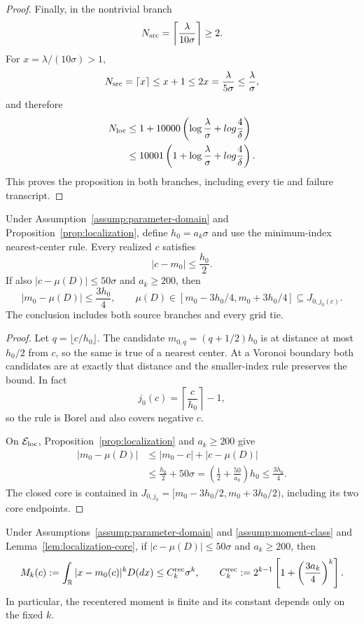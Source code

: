 \begin{proof}
Finally, in the nontrivial branch
\[
 N_{\rm src}=\left\lceil\frac\lambda{10\sigma}\right\rceil\geq2.
\]
For $x=\lambda/(10\sigma)>1$,
\[
 N_{\rm src}=\lceil x\rceil\leq x+1\leq2x
 =\frac\lambda{5\sigma}\leq\frac\lambda\sigma,
\]
and therefore
\[
\begin{aligned}
 N_{\rm loc}
 &\leq1+10000\left(\log\frac\lambda\sigma+log\frac4\delta\right)\\
 &\leq10001\left(1+\log\frac\lambda\sigma+log\frac4\delta\right).
\end{aligned}
\]
This proves the proposition in both branches, including every tie and failure
transcript.
\end{proof}

\begin{lemma}\label{lem:localization-core}
Under Assumption~\ref{assump:parameter-domain} and
Proposition~\ref{prop:localization}, define $h_0=a_k\sigma$ and use the
minimum-index nearest-center rule.  Every realized $c$ satisfies
\[
 |c-m_0|\leq\frac{h_0}{2}.
\]
If also $|c-\mu(D)|\leq50\sigma$ and $a_k\geq200$, then
\[
 |m_0-\mu(D)|\leq\frac{3h_0}{4},\qquad
 \mu(D)\in[m_0-3h_0/4,m_0+3h_0/4]
 \subseteq J_{0,j_0(c)}.
\]
The conclusion includes both source branches and every grid tie.
\end{lemma}

\begin{proof}
Let $q=\lfloor c/h_0\rfloor$.  The candidate
$m_{0,q}=(q+1/2)h_0$ is at distance at most $h_0/2$ from $c$, so the same
is true of a nearest center.  At a Voronoi boundary both candidates are at
exactly that distance and the smaller-index rule preserves the bound.  In
fact
\[
 j_0(c)=\left\lceil\frac c{h_0}\right\rceil-1,
\]
so the rule is Borel and also covers negative $c$.

On $\mathcal E_{\rm loc}$, Proposition~\ref{prop:localization} and
$a_k\geq200$ give
\[
\begin{aligned}
 |m_0-\mu(D)|
 &\leq|m_0-c|+|c-\mu(D)|\\
 &\leq\frac{h_0}{2}+50\sigma
 =\left(\frac12+\frac{50}{a_k}\right)h_0
 \leq\frac{3h_0}{4}.
\end{aligned}
\]
The closed core is contained in
$J_{0,j_0}=[m_0-3h_0/2,m_0+3h_0/2)$, including its two core endpoints.
\end{proof}

\begin{lemma}\label{lem:recentered-moment}
Under Assumptions~\ref{assump:parameter-domain} and
\ref{assump:moment-class} and Lemma~\ref{lem:localization-core}, if
$|c-\mu(D)|\leq50\sigma$ and $a_k\geq200$, then
\[
 M_k(c):=\int_{\mathbb R}|x-m_0(c)|^kD(dx)
 \leq C_k^{\rm rec}\sigma^k,
 \qquad
 C_k^{\rm rec}:=2^{k-1}\left[1+\left(\frac{3a_k}{4}\right)^k\right].
\]
In particular, the recentered moment is finite and its constant depends only
on the fixed $k$.
\end{lemma}

